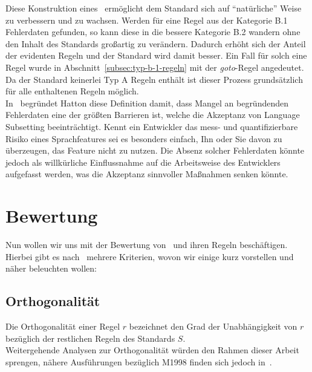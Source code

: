 \documentclass[a4paper,UKenglish,cleveref, autoref]{templates/lipics-v2019}
\begin{document}
    Diese Konstruktion eines \slss\ ermöglicht dem Standard sich auf \enquote{natürliche} Weise zu verbessern und zu wachsen.
    Werden für eine Regel aus der Kategorie B.1 Fehlerdaten gefunden, so kann diese in die bessere Kategorie
    B.2 wandern ohne den Inhalt des Standards großartig zu verändern.
    Dadurch erhöht sich der Anteil der evidenten Regeln und der Standard wird damit besser.
    Ein Fall für solch eine Regel wurde in Abschnitt~\ref{subsec:typ-b-1-regeln} mit der \textit{goto}-Regel angedeutet.
    Da der Standard keinerlei Typ A Regeln enthält ist dieser Prozess grundsätzlich für alle enthaltenen Regeln möglich.\\
    In~\cite{hatton2004safer} begründet Hatton diese Definition damit, dass Mangel an begründenden Fehlerdaten eine der
    größten Barrieren ist, welche die Akzeptanz von Language Subsetting beeinträchtigt.
    Kennt ein Entwickler das mess- und quantifizierbare Risiko eines Sprachfeatures sei es besonders einfach, Ihn oder Sie
    davon zu überzeugen, das Feature nicht zu nutzen.
    Die Absenz solcher Fehlerdaten könnte jedoch als willkürliche Einflussnahme auf die Arbeitsweise des Entwicklers
    aufgefasst werden, was die Akzeptanz sinnvoller Maßnahmen senken könnte.
    
    \section{Bewertung}
    \label{sec:bewertung}

    Nun wollen wir uns mit der Bewertung von \sqss\ und ihren Regeln beschäftigen.
    Hierbei gibt es nach~\cite{hatton2004safer} mehrere Kriterien, wovon wir einige kurz vorstellen und näher beleuchten wollen:

    \subsection{Orthogonalität}
    \label{subsec:orthogonalität}
    Die Orthogonalität einer Regel $r$ bezeichnet den Grad der Unabhängigkeit von $r$ bezüglich der restlichen Regeln
    des Standards $S$.\\
    Weitergehende Analysen zur Orthogonalität würden den Rahmen dieser Arbeit sprengen, nähere Ausführungen bezüglich
    M1998 finden sich jedoch in~\cite{hatton2004safer}.
\end{document}
